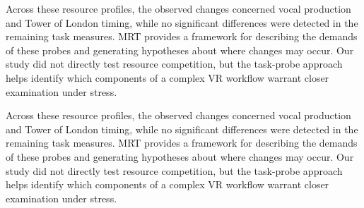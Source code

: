 Across these resource profiles, the observed changes concerned vocal production and Tower of London timing, while no significant differences were detected in the remaining task measures. MRT provides a framework for describing the demands of these probes and generating hypotheses about where changes may occur. Our study did not directly test resource competition, but the task-probe approach helps identify which components of a complex VR workflow warrant closer examination under stress.



Across these resource profiles, the observed changes concerned vocal production and Tower of London timing, while no significant differences were detected in the remaining task measures. MRT provides a framework for describing the demands of these probes and generating hypotheses about where changes may occur. Our study did not directly test resource competition, but the task-probe approach helps identify which components of a complex VR workflow warrant closer examination under stress.


